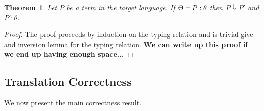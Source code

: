 \documentclass{acm_proc_article-sp}
\newtheorem{thm}{Theorem}
\theoremstyle{definition}
\newcommand{\sreduces}{ \Downarrow }
\begin{document}
\begin{thm}
  Let $P$ be a term in the target language. If $\Theta \vdash P : \theta$ 
  then $P \sreduces P'$ and $P' : \theta$.
\end{thm}
\begin{proof}
The proof proceeds by induction on the typing relation and is trivial give
and inversion lemma for the typing relation. \textbf{We can write up this proof if we end up having enough space...}
\end{proof}

\subsection{Translation Correctness}

We now present the main correctness result.
\end{document}
